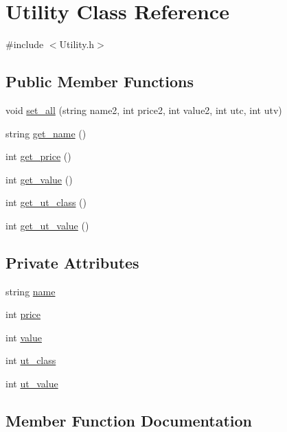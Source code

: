 \hypertarget{classUtility}{}\section{Utility Class Reference}
\label{classUtility}


{\ttfamily \#include $<$Utility.\+h$>$}

\subsection*{Public Member Functions}
\begin{DoxyCompactItemize}
\item 
void \hyperlink{classUtility_abe96d66bedd9c441feb772826a9057b6}{set\+\_\+all} (string name2, int price2, int value2, int utc, int utv)
\item 
string \hyperlink{classUtility_aa052317fec45ed87060338b4808d4420}{get\+\_\+name} ()
\item 
int \hyperlink{classUtility_a26bc0e559ef6d73c99a8f71e01fa11fa}{get\+\_\+price} ()
\item 
int \hyperlink{classUtility_a1e0457f8715e5894e63dd100dd9e8294}{get\+\_\+value} ()
\item 
int \hyperlink{classUtility_a73bf8de65fa561a3461c1fbc23619290}{get\+\_\+ut\+\_\+class} ()
\item 
int \hyperlink{classUtility_ae2631ea454dd742eac813524634152d3}{get\+\_\+ut\+\_\+value} ()
\end{DoxyCompactItemize}
\subsection*{Private Attributes}
\begin{DoxyCompactItemize}
\item 
string \hyperlink{classUtility_ab8c4475f3e8914e7433ae2d6f4b90ea3}{name}
\item 
int \hyperlink{classUtility_a6530849c80df2049f03561e334c16c84}{price}
\item 
int \hyperlink{classUtility_aa9501be82bb8a484f4fccca328b742af}{value}
\item 
int \hyperlink{classUtility_a99c826a24bddd5081149062d0015b177}{ut\+\_\+class}
\item 
int \hyperlink{classUtility_a71b0a68187151843ff6ae4bdb92e98dd}{ut\+\_\+value}
\end{DoxyCompactItemize}


\subsection{Member Function Documentation}
\mbox{\label{classUtility_aa052317fec45ed87060338b4808d4420}} 
